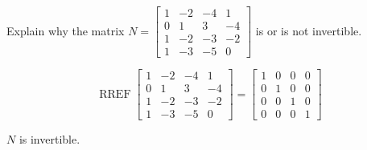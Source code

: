 
\begin{exerciseStatement}


Explain why the matrix \(N= \left[\begin{array}{cccc}
1 & -2 & -4 & 1 \\
0 & 1 & 3 & -4 \\
1 & -2 & -3 & -2 \\
1 & -3 & -5 & 0
\end{array}\right] \) is or is not invertible.


\end{exerciseStatement}
    
\begin{exerciseAnswer} 


\[\operatorname{RREF} \left[\begin{array}{cccc}
1 & -2 & -4 & 1 \\
0 & 1 & 3 & -4 \\
1 & -2 & -3 & -2 \\
1 & -3 & -5 & 0
\end{array}\right] = \left[\begin{array}{cccc}
1 & 0 & 0 & 0 \\
0 & 1 & 0 & 0 \\
0 & 0 & 1 & 0 \\
0 & 0 & 0 & 1
\end{array}\right] \]

\(N\) is invertible.
\end{exerciseAnswer}
    
